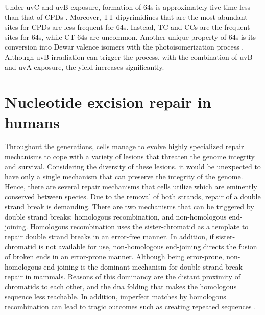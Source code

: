 Under \gls{uv}C and \gls{uv}B exposure, formation of \gls{64}s is approximately five time less than that of \gls{CPD}s \citep{douki2001individual}. Moreover, \gls{T}\gls{T} dipyrimidines that are the most abundant sites for \gls{CPD}s are less frequent for \gls{64}s. Instead, \gls{T}\gls{C} and \gls{C}\gls{C}s are the frequent sites for \gls{64}s, while \gls{C}\gls{T} \gls{64}s are uncommon. Another unique property of \gls{64}s is its conversion into Dewar valence isomers with the photoisomerization process \citep{taylor1987dna}. Although \gls{uv}B irradiation can trigger the process, with the combination of \gls{uv}B and \gls{uv}A exposure, the yield increases significantly.

\section{Nucleotide excision repair in humans}

Throughout the generations, cells manage to evolve highly specialized repair mechanisms to cope with a variety of lesions that threaten the genome integrity and survival. Considering the diversity of these lesions, it would be unexpected to have only a single mechanism that can preserve the integrity of the genome. Hence, there are several repair mechanisms that cells utilize which are eminently conserved between species. Due to the removal of both strands, repair of a double strand break is demanding. There are two mechanisms that can be triggered by double strand breaks: homologous recombination, and non-homologous end-joining. Homologous recombination uses the sister-chromatid as a template to repair double strand breaks in an error-free manner. In addition, if sister-chromatid is not available for use, non-homologous end-joining directs the fusion of broken ends in an error-prone manner. Although being error-prone, non-homologous end-joining is the dominant mechanism for double strand break repair in mammals. Reasons of this dominancy are the distant proximity of chromatids to each other, and the \gls{dna} folding that makes the homologous sequence less reachable. In addition, imperfect matches by homologous recombination can lead to tragic outcomes such as creating repeated sequences \citep{li2018mismatch}.

